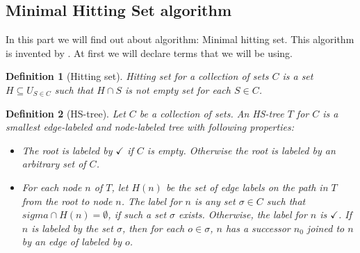 \documentclass[12pt,a4paper]{article}
\newtheorem{definition}{Definition}[subsection]
\begin{document}
\subsection{Minimal Hitting Set algorithm}
In this part we will find out about algorithm: Minimal hitting set. This algorithm is invented by \citep{reiterHS}. At first we will declare terms that we will be using.

\begin{definition}[Hitting set]
	Hitting set for a collection of sets $C$ is a set $H \subseteq U_{S \in C}$ such that $H \cap S$ is not empty set for each $S \in C$.
\end{definition}

\begin{definition}[HS-tree]
	Let $C$ be a collection of sets. An HS-tree $T$ for $C$ is a smallest edge-labeled and node-labeled tree with following properties:
	
	\begin{itemize}
		\item The root is labeled by $\checkmark$ if $C$ is empty. Otherwise the root is labeled by an arbitrary set of $C$.
		
		\item For each node $n$ of $T$, let $H(n)$ be the set of edge labels on the path in $T$ from the root to node $n$. The label for $n$ is any set $\sigma \in C$ such that $sigma \cap H(n) = \emptyset$, if such a set $\sigma$ exists. Otherwise, the label for $n$ is $\checkmark$. If $n$ is labeled by the set $\sigma$, then for each $o \in \sigma$, $n$ has a successor $n_{0}$ joined to $n$ by an edge of labeled by $o$.
	\end{itemize}
	
\end{definition}
\end{document}
